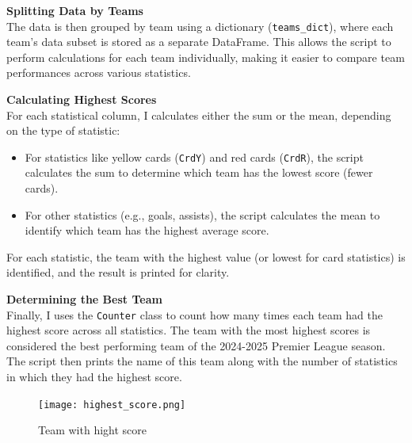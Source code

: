 \documentclass[a4paper,12pt]{article}
\begin{document}
\begin{itemize}[label= {*}, leftmargin= 1cm]
\begin{itemize}[label= {}, leftmargin= 1cm]
        \textbf{Splitting Data by Teams}\\
        The data is then grouped by team using a dictionary (\texttt{teams\_dict}), where each team’s data subset is stored as a separate DataFrame. This allows the script to perform calculations for each team individually, making it easier to compare team performances across various statistics.
        \vspace{0.3cm}
        
        \textbf{Calculating Highest Scores}\\
        For each statistical column, I calculates either the sum or the mean, depending on the type of statistic:
        \begin{itemize}
            \item For statistics like yellow cards (\texttt{CrdY}) and red cards (\texttt{CrdR}), the script calculates the sum to determine which team has the lowest score (fewer cards).
            \item For other statistics (e.g., goals, assists), the script calculates the mean to identify which team has the highest average score.
        \end{itemize}
        For each statistic, the team with the highest value (or lowest for card statistics) is identified, and the result is printed for clarity.
        \vspace{0.3cm}

        \newpage
        \textbf{Determining the Best Team}\\
        Finally, I uses the \texttt{Counter} class to count how many times each team had the highest score across all statistics. The team with the most highest scores is considered the best performing team of the 2024-2025 Premier League season. The script then prints the name of this team along with the number of statistics in which they had the highest score.

        \begin{figure}
            \centering
            \texttt{[image: highest\_score.png]}
            \caption{Team with hight score}
        \end{figure}
        

\end{itemize}
\end{itemize}
\end{document}
